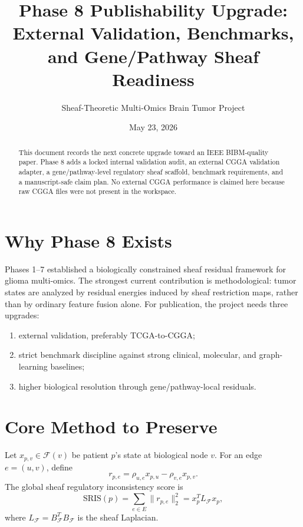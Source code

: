 \documentclass[11pt]{article}
\title{Phase 8 Publishability Upgrade: External Validation, Benchmarks, and Gene/Pathway Sheaf Readiness}
\author{Sheaf-Theoretic Multi-Omics Brain Tumor Project}
\date{May 23, 2026}
\begin{document}
\maketitle
\begin{abstract}
This document records the next concrete upgrade toward an IEEE BIBM-quality paper. Phase 8 adds a locked internal validation audit, an external CGGA validation adapter, a gene/pathway-level regulatory sheaf scaffold, benchmark requirements, and a manuscript-safe claim plan. No external CGGA performance is claimed here because raw CGGA files were not present in the workspace.
\end{abstract}
\tableofcontents
\newpage
\section{Why Phase 8 Exists}
Phases 1--7 established a biologically constrained sheaf residual framework for glioma multi-omics. The strongest current contribution is methodological: tumor states are analyzed by residual energies induced by sheaf restriction maps, rather than by ordinary feature fusion alone. For publication, the project needs three upgrades:
\begin{enumerate}[leftmargin=*]
\item external validation, preferably TCGA-to-CGGA;
\item strict benchmark discipline against strong clinical, molecular, and graph-learning baselines;
\item higher biological resolution through gene/pathway-local residuals.
\end{enumerate}
\section{Core Method to Preserve}
Let $x_{p,v}\in \mathcal F(v)$ be patient $p$'s state at biological node $v$. For an edge $e=(u,v)$, define
\begin{equation}
 r_{p,e}=\rho_{u,e}x_{p,u}-\rho_{v,e}x_{p,v}.
\end{equation}
The global sheaf regulatory inconsistency score is
\begin{equation}
 \mathrm{SRIS}(p)=\sum_{e\in E}\|r_{p,e}\|_2^2=x_p^T L_{\mathcal F}x_p,
\end{equation}
where $L_{\mathcal F}=B_{\mathcal F}^TB_{\mathcal F}$ is the sheaf Laplacian.
\end{document}
